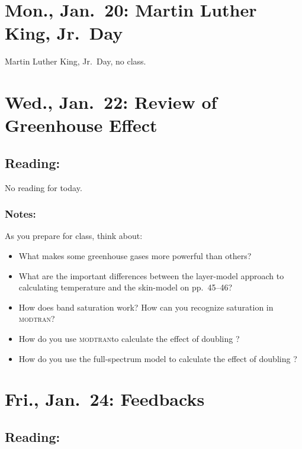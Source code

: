 \documentclass[
]{article}
\providecommand{\tightlist}{%
  \setlength{\itemsep}{0pt}\setlength{\parskip}{0pt}}
\newcommand{\COO}{\ce{CO2}}
\newcommand{\MODTRAN}{\textsc{modtran}}
\begin{document}
\hypertarget{mon.-jan.-20-martin-luther-king-jr.-day}{%
\section{Mon., Jan.~20: Martin Luther King,
Jr.~Day}\label{mon.-jan.-20-martin-luther-king-jr.-day}}

Martin Luther King, Jr.~Day, no class.

\hypertarget{wed.-jan.-22-review-of-greenhouse-effect}{%
\section{Wed., Jan.~22: Review of Greenhouse
Effect}\label{wed.-jan.-22-review-of-greenhouse-effect}}

\hypertarget{reading-6}{%
\subsection{Reading:}\label{reading-6}}

No reading for today.

\hypertarget{notes}{%
\subsubsection{Notes:}\label{notes}}

As you prepare for class, think about:

\begin{itemize}
\tightlist
\item
  What makes some greenhouse gases more powerful than others?
\item
  What are the important differences between the layer-model approach to
  calculating temperature and the skin-model on pp.~45--46?
\item
  How does band saturation work? How can you recognize saturation in
  \MODTRAN?
\item
  How do you use \MODTRAN to calculate the effect of doubling \COO?
\item
  How do you use the full-spectrum model to calculate the effect of
  doubling \COO?
\end{itemize}

\hypertarget{fri.-jan.-24-feedbacks}{%
\section{Fri., Jan.~24: Feedbacks}\label{fri.-jan.-24-feedbacks}}

\hypertarget{reading-7}{%
\subsection{Reading:}\label{reading-7}}
\end{document}
